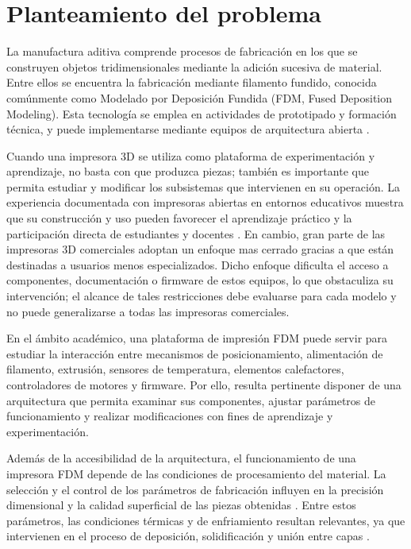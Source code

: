 \section{Planteamiento del problema}
La manufactura aditiva comprende procesos de fabricación en los que se construyen objetos tridimensionales mediante la adición sucesiva de material. Entre ellos se encuentra la fabricación mediante filamento fundido, conocida comúnmente como Modelado por Deposición Fundida (FDM, Fused Deposition Modeling). Esta tecnología se emplea en actividades de prototipado y formación técnica, y puede implementarse mediante equipos de arquitectura abierta \cite{iso_52900_2021}.

Cuando una impresora 3D se utiliza como plataforma de experimentación y aprendizaje, no basta con que produzca piezas; también es importante que permita estudiar y modificar los subsistemas que intervienen en su operación. La experiencia documentada con impresoras abiertas en entornos educativos muestra que su construcción y uso pueden favorecer el aprendizaje práctico y la participación directa de estudiantes y docentes \cite{schelly_2015}. En cambio, gran parte de las impresoras 3D comerciales adoptan un enfoque mas cerrado gracias a que están destinadas a usuarios menos especializados. Dicho enfoque dificulta el acceso a componentes, documentación o firmware de estos equipos, lo que obstaculiza su intervención; el alcance de tales restricciones debe evaluarse para cada modelo y no puede generalizarse a todas las impresoras comerciales.

En el ámbito académico, una plataforma de impresión FDM puede servir para estudiar la interacción entre mecanismos de posicionamiento, alimentación de filamento, extrusión, sensores de temperatura, elementos calefactores, controladores de motores y firmware. Por ello, resulta pertinente disponer de una arquitectura que permita examinar sus componentes, ajustar parámetros de funcionamiento y realizar modificaciones con fines de aprendizaje y experimentación.

Además de la accesibilidad de la arquitectura, el funcionamiento de una impresora FDM depende de las condiciones de procesamiento del material. La selección y el control de los parámetros de fabricación influyen en la precisión dimensional y la calidad superficial de las piezas obtenidas \cite{kechagias_2022}. Entre estos parámetros, las condiciones térmicas y de enfriamiento resultan relevantes, ya que intervienen en el proceso de deposición, solidificación y unión entre capas \cite{zhang_2019}.

